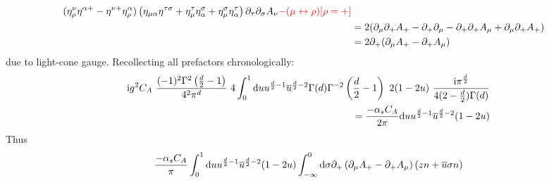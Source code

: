 \begin{align}
	(\eta^{\nu}_\rho \eta^{\alpha + } - \eta^{\nu +} \eta^{\alpha}_\rho)\left(\eta_{\mu\alpha}\eta^{\tau \sigma} + \eta_\mu^{\tau} \eta_\alpha^{\sigma} +\eta_\mu^{\sigma}\eta_{\alpha}^{\tau}\right)\partial_\tau \partial_\sigma A_\nu  {\color{red}- (\mu \leftrightarrow \rho)  [\rho = +]}
	\\
	&=
	2(\partial_\mu \partial_+ A_+ - \partial_+\partial_\mu -\partial_+ \partial_+ A_\mu  + \partial_\mu \partial_+ A_+)
	\\
	&=
	2\partial_+ (\partial_\mu A_+ - \partial_+ A_\mu)
\end{align} 
due to light-cone gauge.
Recollecting all prefactors chronologically:
\begin{align}
	\text{i} g^2 C_A ~ \frac{(-1)^2\Gamma^2\left(\frac{d}{2}-1\right)}{4^2\pi^d} ~ 4\int_0^1 \text{d} u u^{\frac{d}{2}-1}\overline u^{\frac{d}{2}-2}\Gamma(d)\Gamma^{-2}\left(\frac{d}{2}-1\right)~2(1-2u)~
	\frac{\text{i} \pi^{\frac{d}{2}}}{4(2-\frac{d}{2})\Gamma(d)}
	\\
	=
	\frac{-\alpha_s C_A}{2\pi}\text{d} u u^{\frac{d}{2}-1}\overline u^{\frac{d}{2}-2}(1-2u)
\end{align}
Thus
\begin{align}
	\frac{-\alpha_s C_A}{\pi}\int _0^1\text{d} u u^{\frac{d}{2}-1}\overline u^{\frac{d}{2}-2}(1-2u) \int_{-\infty}^0 \text{d} \sigma \partial_+ \left(\partial_\mu A_+ - \partial_+ A_\mu\right)(zn + \overline u \sigma n)
\end{align}

